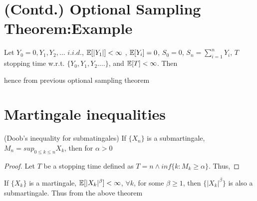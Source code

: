 \documentclass[all-lectures.tex]{subfiles}
\begin{document}

\setcounter{section}{1}
\setcounter{subsection}{1}

\section*{}
\chr
\section{(Contd.) Optional Sampling Theorem:Example}
\begin{exmp}
Let $Y_0 = 0, Y_1, Y_2, \dots$ $i.i.d.$, $\mathbb{E}[|Y_1|] < \infty$ , $\mathbb{E}[Y_i]= 0$,
$S_0 = 0$, $S_n = \sum_{i=1}^{n} Y_i$, $T$ stopping time w.r.t. $\{Y_0, Y_1, Y_2. \dots\}$, and  $\mathbb{E}[T]< \infty$. Then

hence from previous optional sampling theorem
\end{exmp}

\section{Martingale inequalities}
\begin{thm}(Doob's inequality for submatingales)
If $\{X_n\}$ is a submartingale, $M_n = sup_{0 \le k \le n} X_k$, then for $\alpha>0$
\end{thm}
\begin{proof}
Let $T$ be a stopping time defined as $T= n \wedge inf\{k:M_k \ge \alpha\}$.
Thus,
\end{proof}
If  $\{X_k\}$ is a martingale, $\mathbb{E}[|X_k|^\beta] < \infty$, $\forall k$, for some $\beta \ge 1$, then $\{|X_k|^\beta\}$ is also a submartingale. Thus from the above theorem
\end{document}
